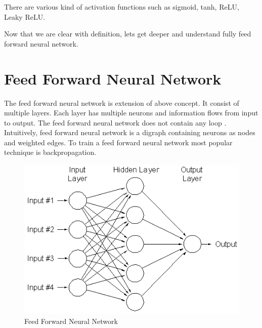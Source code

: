 There are various kind of activation functions such as sigmoid, tanh, ReLU, Leaky ReLU.

\par
Now that we are clear with definition, lets get deeper and understand fully feed forward neural network.
\section{Feed Forward Neural Network}
The feed forward neural network is extension of above concept. It consist of multiple layers. Each layer has multiple neurons and information flows from input to output. The feed forward neural network does not contain any loop . Intuitively, feed forward neural network is a digraph containing neurons as nodes and weighted edges. To train a feed forward neural network most popular technique is backpropagation.
\begin{figure}[H]
  \centering
    \includegraphics[scale=.6, angle=0]{Files/FFNN.png}
    \caption[Feed Forward Neural Network]{Feed Forward Neural Network}
    \label{fig:FFNN}
\end{figure}

